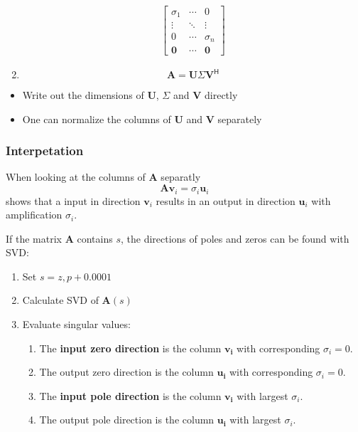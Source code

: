 \begin{enumerate}
\begin{align*}
              \begin{bmatrix}
                  \sigma_1   & \cdots & 0          \\
                  \vdots     & \ddots & \vdots     \\
                  0          & \cdots & \sigma_{n} \\
                  \mathbf{0} & \cdots & \mathbf{0}
              \end{bmatrix}
          \end{align*}
    \item \noindent\begin{equation*}
              \mathbf{A}=\mathbf{U}\Sigma \mathbf{V}^{\mathsf{H}}
          \end{equation*}
\end{enumerate}


\begin{itemize}
    \item Write out the dimensions of $\mathbf{U}$, $\Sigma$ and $\mathbf{V}$ directly
    \item One can normalize the columns of $\mathbf{U}$ and $\mathbf{V}$ separately
\end{itemize}

\subsubsection{Interpetation}
When looking at the columns of $\mathbf{A}$ separatly
\noindent\begin{equation*}
    \mathbf{Av}_i=\sigma_i \mathbf{u}_i
\end{equation*}
shows that a input in direction $\mathbf{v}_i$ results in an output in direction $\mathbf{u}_i$ with amplification $\sigma_i$.

\newpar{}

If the matrix $\mathbf{A}$ contains $s$, the directions of poles and zeros can be found with SVD:
\begin{enumerate}
    \item Set $s=z, p+0.0001$
    \item Calculate SVD of $\mathbf{A}(s)$
    \item Evaluate singular values:
          \begin{enumerate}
              \item The \textbf{input zero direction} is the column $\mathbf{v_i}$ with corresponding $\sigma_i=0$.
              \item The output zero direction is the column $\mathbf{u_i}$ with corresponding $\sigma_i=0$.
              \item The \textbf{input pole direction} is the column $\mathbf{v_i}$ with largest $\sigma_i$.
              \item The output pole direction is the column $\mathbf{u_i}$ with largest $\sigma_i$.
          \end{enumerate}
\end{enumerate}


